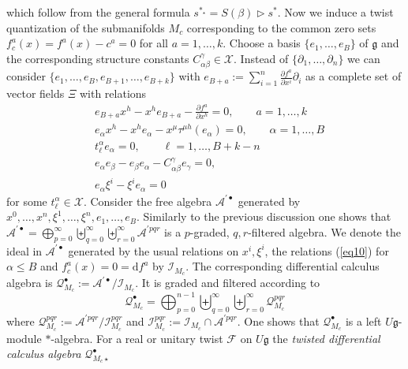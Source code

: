\documentclass[a4paper,11pt]{article}
\begin{document}
which follow from the general formula $s^{*_\star}    =S(\beta)\rhd s^*$.
Now we induce a twist quantization of the submanifolds $M_c$
corresponding to the common zero sets $f^a_c(x)=f^a(x)-c^a=0$ for all $a=1,\ldots,k$.
Choose a basis $\{e_1,\ldots,e_B\}$ of $\mathfrak{g}$ and the corresponding
structure constants $C^\gamma_{\alpha\beta}\in\mathcal{X}$. Instead of
$\{\partial_1,\ldots,\partial_n\}$ we can consider $\{e_1,\ldots,e_B,e_{B+1},\ldots,
e_{B+k}\}$
with $e_{B+a}:=\sum_{i=1}^n\frac{\partial f^a}{\partial x^i}\partial_i$
as a complete set of vector fields $\Xi$ with relations
\begin{equation}\label{eq10}
\begin{split}
    &e_{B+a}x^h-x^he_{B+a}-\frac{\partial f^a}{\partial x^h}=0,\qquad   a=1,\ldots,k\\
    &e_\alpha x^h-x^he_\alpha-x^\mu\tau^{\mu h}(e_\alpha)=0,\qquad  \alpha=1,\ldots,B\\
    &t^\alpha_\ell e_\alpha=0,\qquad  \ell=1,\ldots,B+k-n\\
    &e_\alpha e_\beta-e_\beta e_\alpha-C^\gamma_{\alpha\beta}e_\gamma=0,  \\
    &e_\alpha\xi^i-\xi^ie_\alpha=0 
\end{split}
\end{equation}
for some $t_\ell^\alpha\in\mathcal{X}$.
Consider the free algebra $\mathcal{A}^{'\bullet}$ generated by
$x^0,\ldots,x^n,\xi^1,\ldots,\xi^n,e_1,\ldots,e_B$. Similarly to the previous
discussion one shows that
$\mathcal{A}^{'\bullet}=\bigoplus_{p=0}^\infty\biguplus_{q=0}^\infty
\biguplus_{r=0}^\infty\mathcal{A}^{'pqr}$ is a $p$-graded, $q,r$-filtered
algebra. We denote the ideal in $\mathcal{A}^{'\bullet}$ generated by
the usual relations on $x^i,\xi^i$, the relations (\ref{eq10}) for
$\alpha\leq B$ and $f^a_c(x)=0=\mathrm{d}f^a$
by $\mathcal{I}_{M_c}$. The corresponding differential calculus algebra is
$\mathcal{Q}^\bullet_{M_c}:=\mathcal{A}^{'\bullet}/\mathcal{I}_{M_c}$.
It is graded and filtered according to
\begin{equation}
    \mathcal{Q}^\bullet_{M_c}=
    \bigoplus_{p=0}^{n-1}\biguplus_{q=0}^\infty
    \biguplus_{r=0}^\infty\mathcal{Q}^{pqr}_{M_c}
\end{equation}
where $\mathcal{Q}^{pqr}_{M_c}:=\mathcal{A}^{'pqr}/\mathcal{I}^{pqr}_{M_c}$
and $\mathcal{I}^{pqr}_{M_c}:=\mathcal{I}_{M_c}\cap\mathcal{A}^{'pqr}$.
One shows that $\mathcal{Q}^\bullet_{M_c}$ is a left $U\mathfrak{g}$-module
$*$-algebra.
For a real or unitary twist $\mathcal{F}$ on $U\mathfrak{g}$ the
\textit{twisted differential calculus algebra} $\mathcal{Q}^\bullet_{M_c\star}$
\end{document}
